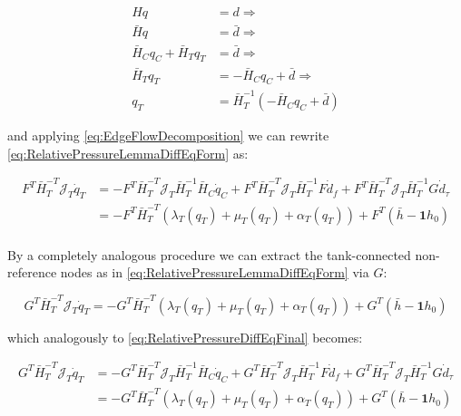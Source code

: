\begin{equation}\label{eq:MassConservationPartitioned}
	\begin{split}
	H q &= d \Rightarrow \\  
	\bar{H}q &= \bar{d} \Rightarrow \\
	\bar{H}_C q_C + \bar{H}_T q_T &= \bar{d} \Rightarrow \\
	\bar{H}_T q_T &= -\bar{H}_C q_C + \bar{d} \Rightarrow	\\
	q_T &= \bar{H}_T^{-1}(-\bar{H}_C q_C + \bar{d})
	\end{split}
\end{equation}

and applying \cref{eq:EdgeFlowDecomposition} we can rewrite \cref{eq:RelativePressureLemmaDiffEqForm} as:

\begin{equation}\label{eq:RelativePressureDiffEqFinal}
	\begin{split}
	F^T\bar{H}_T^{-T}\mathcal{J}_T\dot{q}_T &= 
	-F^T\bar{H}_T^{-T}\mathcal{J}_T\bar{H}_T^{-1}\bar{H}_C\dot{q}_C + F^T\bar{H}_T^{-T}\mathcal{J}_T\bar{H}_T^{-1}F\dot{d}_f + F^T\bar{H}_T^{-T}\mathcal{J}_T\bar{H}_T^{-1}G\dot{d}_{\tau} \\
	&= -F^T\bar{H}_T^{-T}(\lambda_T(q_T)+\mu_T(q_T) + \alpha_T(q_T)) + 
	F^T(\bar{h} - \mathbf{1}h_0) \\	
	\end{split}
\end{equation}

By a completely analogous procedure we can extract the tank-connected non-reference nodes as in \cref{eq:RelativePressureLemmaDiffEqForm} via $G$:

\begin{equation}\label{eq:RelativePressureLemmaDiffEqFormG}
	G^T\bar{H}_T^{-T}\mathcal{J}_T\dot{q}_T = - 	G^T\bar{H}_T^{-T}(\lambda_T(q_T)+\mu_T(q_T) + \alpha_T(q_T)) + 
	G^T(\bar{h} - \mathbf{1}h_0)
\end{equation}

which analogously to \cref{eq:RelativePressureDiffEqFinal} becomes:

\begin{equation}\label{eq:RelativePressureDiffEqFinalG}
	\begin{split}
		G^T\bar{H}_T^{-T}\mathcal{J}_T\dot{q}_T &= 
		-G^T\bar{H}_T^{-T}\mathcal{J}_T\bar{H}_T^{-1}\bar{H}_C\dot{q}_C + G^T\bar{H}_T^{-T}\mathcal{J}_T\bar{H}_T^{-1}F\dot{d}_f + G^T\bar{H}_T^{-T}\mathcal{J}_T\bar{H}_T^{-1}G\dot{d}_{\tau} \\
		&= -G^T\bar{H}_T^{-T}(\lambda_T(q_T)+\mu_T(q_T) + \alpha_T(q_T)) + 
		G^T(\bar{h} - \mathbf{1}h_0) \\	
	\end{split}
\end{equation}

